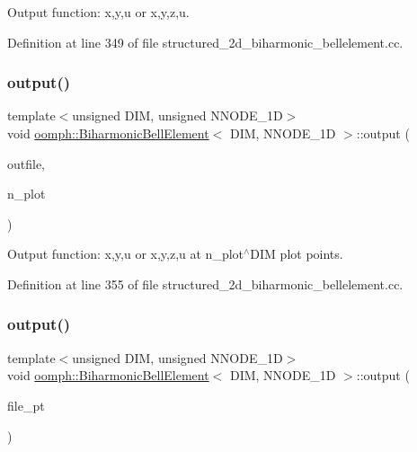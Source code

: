 Output function\+: x,y,u or x,y,z,u. 



Definition at line 349 of file structured\+\_\+2d\+\_\+biharmonic\+\_\+bellelement.\+cc.

\mbox{\label{classoomph_1_1BiharmonicBellElement_a7c1a4a4a1743788bc1d557b0e4af51cf}} 
\subsubsection{\texorpdfstring{output()}{output()}\hspace{0.1cm}{\footnotesize\ttfamily [2/4]}}
{\footnotesize\ttfamily template$<$unsigned D\+IM, unsigned N\+N\+O\+D\+E\+\_\+1D$>$ \\
void \hyperlink{classoomph_1_1BiharmonicBellElement}{oomph\+::\+Biharmonic\+Bell\+Element}$<$ D\+IM, N\+N\+O\+D\+E\+\_\+1D $>$\+::output (\begin{DoxyParamCaption}\item[{std\+::ostream \&}]{outfile,  }\item[{const unsigned \&}]{n\+\_\+plot }\end{DoxyParamCaption})\hspace{0.3cm}{\ttfamily [inline]}}



Output function\+: x,y,u or x,y,z,u at n\+\_\+plot$^\wedge$\+D\+IM plot points. 



Definition at line 355 of file structured\+\_\+2d\+\_\+biharmonic\+\_\+bellelement.\+cc.

\mbox{\label{classoomph_1_1BiharmonicBellElement_a56802e7006ca17de8d4b980827e96569}} 
\subsubsection{\texorpdfstring{output()}{output()}\hspace{0.1cm}{\footnotesize\ttfamily [3/4]}}
{\footnotesize\ttfamily template$<$unsigned D\+IM, unsigned N\+N\+O\+D\+E\+\_\+1D$>$ \\
void \hyperlink{classoomph_1_1BiharmonicBellElement}{oomph\+::\+Biharmonic\+Bell\+Element}$<$ D\+IM, N\+N\+O\+D\+E\+\_\+1D $>$\+::output (\begin{DoxyParamCaption}\item[{F\+I\+LE $\ast$}]{file\+\_\+pt }\end{DoxyParamCaption})\hspace{0.3cm}{\ttfamily [inline]}}



